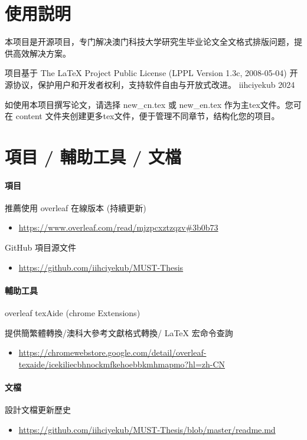 \documentclass[
    writingLanguage=chinese, %
    addPageTitle=on,  %
    addDeclaration=on, %
    addMUSTlog=on, %
    addFigTOC=on, %
    addTabTOC=on, %
    refIndent=off, %
    printMod=off, %
]{must}
\begin{document}
\addtableofcontents


\chapter{使用説明}
本项目是开源项目，专门解决澳门科技大学研究生毕业论文全文格式排版问题，提供高效解决方案。

项目基于 The LaTeX Project Public License (LPPL Version 1.3c, 2008-05-04) 开源协议，保护用户和开发者权利，支持软件自由与开放式改进。 \faCopyright iihciyekub 2024

如使用本项目撰写论文，请选择 new\_cn.tex 或 new\_en.tex 作为主tex文件。您可在 content 文件夹创建更多tex文件，便于管理不同章节，结构化您的项目。

\chapter{項目 / 輔助工具 / 文檔}
\subsubsection{項目}

\noindent \faLeaf\; 推薦使用 overleaf 在線版本 (持續更新) 
\begin{itemize}
    \item \url{https://www.overleaf.com/read/mjzpcxztzqzv#3b0b73}
\end{itemize}

\noindent \faGithub\;  GitHub 項目源文件 
\begin{itemize}
    \item \url{https://github.com/iihciyekub/MUST-Thesis}
\end{itemize}


\subsubsection{輔助工具}

\noindent \faChrome\; overleaf texAide (chrome Extensions) 

提供簡繁體轉換/澳科大參考文獻格式轉換/ \LaTeX{} 宏命令查詢 
\begin{itemize}
    \item \url{https://chromewebstore.google.com/detail/overleaf-texaide/icekiliecbhnockmfkehoebbkmhmapmo?hl=zh-CN}
\end{itemize}



\subsubsection{文檔}
\noindent \faHistory\; 設計文檔更新歷史 
\begin{itemize}
    \item \url{https://github.com/iihciyekub/MUST-Thesis/blob/master/readme.md}
\end{itemize}
\end{document}

